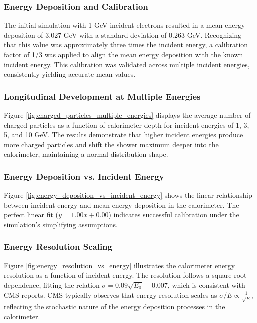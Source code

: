 \documentclass[twocolumn]{aastex631}
\begin{document}
\subsubsection{Energy Deposition and Calibration}

The initial simulation with 1 GeV incident electrons resulted in a mean energy deposition of 3.027 GeV with a standard deviation of 0.263 GeV. Recognizing that this value was approximately three times the incident energy, a calibration factor of 1/3 was applied to align the mean energy deposition with the known incident energy. This calibration was validated across multiple incident energies, consistently yielding accurate mean values.

\subsubsection{Longitudinal Development at Multiple Energies}

Figure \ref{fig:charged_particles_multiple_energies} displays the average number of charged particles as a function of calorimeter depth for incident energies of 1, 3, 5, and 10 GeV. The results demonstrate that higher incident energies produce more charged particles and shift the shower maximum deeper into the calorimeter, maintaining a normal distribution shape.

\subsubsection{Energy Deposition vs. Incident Energy}

Figure \ref{fig:energy_deposition_vs_incident_energy} shows the linear relationship between incident energy and mean energy deposition in the calorimeter. The perfect linear fit (\(y = 1.00x + 0.00\)) indicates successful calibration under the simulation's simplifying assumptions.

\subsubsection{Energy Resolution Scaling}

Figure \ref{fig:energy_resolution_vs_energy} illustrates the calorimeter energy resolution as a function of incident energy. The resolution follows a square root dependence, fitting the relation \(\sigma = 0.09 \sqrt{E_0} - 0.007\), which is consistent with CMS reports. CMS typically observes that energy resolution scales as \(\sigma/E \propto \frac{1}{\sqrt{E}}\), reflecting the stochastic nature of the energy deposition processes in the calorimeter.
\end{document}
